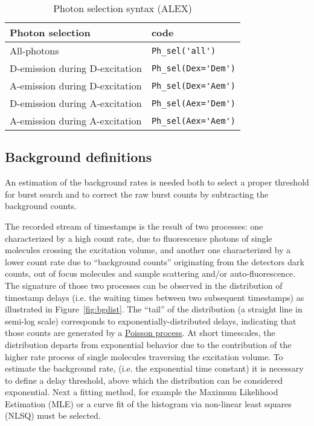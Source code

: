 \begin{table}
\begin{tabular}{l|l}
  Photon selection  & code \\
  \hline
  All-photons & \verb|Ph_sel('all')|\\
  D-emission during D-excitation & \verb|Ph_sel(Dex='Dem')|\\
  A-emission during D-excitation & \verb|Ph_sel(Dex='Aem')|\\
  D-emission during A-excitation & \verb|Ph_sel(Aex='Dem')|\\
  A-emission during A-excitation & \verb|Ph_sel(Aex='Aem')|\\
\end{tabular}
\caption{\label{tab:ph_sel_alex}Photon selection syntax (ALEX)}
\end{table}

\subsection{Background definitions}
\label{sec:bg_intro}

An estimation of the background rates is needed both to select a proper threshold for
burst search and to correct the raw burst counts by subtracting the background counts.

The recorded stream of timestamps is the result of two processes: one characterized
by a high count rate, due to fluorescence photons of single molecules crossing the 
excitation volume, and another one characterized by a lower count rate due to “background
counts” originating from the detectors dark counts, out of focus molecules
and sample scattering and/or auto-fluorescence\cite{Gopich_2008}. 
The signature of those two processes can be 
observed in the distribution of timestamp delays (i.e. the waiting times 
between two subsequent timestamps) as illustrated in Figure~\ref{fig:bgdist}.
The “tail” of the distribution (a straight line in semi-log scale) corresponds 
to exponentially-distributed delays, indicating that those counts are generated by a
\href{http://en.wikipedia.org/wiki/Poisson_process}{Poisson process}. At short
timescales, the distribution departs from exponential behavior due to the contribution 
of the higher rate process of single molecules traversing the excitation volume. 
To estimate the background rate, (i.e. the exponential time constant) 
it is necessary to define a delay threshold, above which the distribution 
can be considered exponential. 
Next a fitting method, for example the Maximum
Likelihood Estimation (MLE) or a curve fit of the histogram via non-linear
least squares (NLSQ) must be selected.

